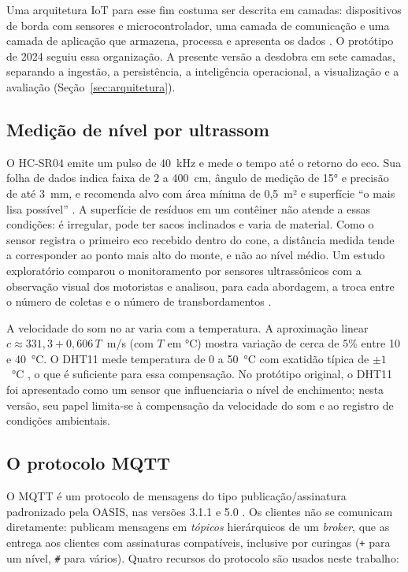 Uma arquitetura IoT para esse fim costuma ser descrita em camadas: dispositivos
de borda com sensores e microcontrolador, uma camada de comunicação e uma
camada de aplicação que armazena, processa e apresenta os dados
\cite{oliveira2018arquitetura}. O protótipo de 2024 seguiu essa organização.
A presente versão a desdobra em sete camadas, separando a ingestão, a
persistência, a inteligência operacional, a visualização e a avaliação
(Seção~\ref{sec:arquitetura}).

\subsection{Medição de nível por ultrassom}

O HC-SR04 emite um pulso de 40~kHz e mede o tempo até o retorno do eco. Sua
folha de dados indica faixa de 2 a 400~cm, ângulo de medição de 15° e precisão
de até 3~mm, e recomenda alvo com área mínima de 0,5~m² e superfície ``o mais
lisa possível'' \cite{elecfreakssdhcsr04}. A superfície de resíduos em um
contêiner não atende a essas condições: é irregular, pode ter sacos inclinados
e varia de material. Como o sensor registra o primeiro eco recebido dentro do
cone, a distância medida tende a corresponder ao ponto mais alto do monte, e
não ao nível médio. Um estudo exploratório comparou o monitoramento por sensores ultrassônicos com
a observação visual dos motoristas e analisou, para cada abordagem, a troca
entre o número de coletas e o número de transbordamentos
\cite{brouwer2023comparison}.

A velocidade do som no ar varia com a temperatura. A aproximação linear
$c \approx 331{,}3 + 0{,}606\,T$~m/s (com $T$ em °C) mostra variação de cerca
de 5\% entre 10 e 40~°C. O DHT11 mede temperatura de 0 a 50~°C com exatidão
típica de $\pm1$~°C \cite{drobotics2010dht11}, o que é suficiente para essa
compensação. No protótipo original, o DHT11 foi apresentado como um sensor que
influenciaria o nível de enchimento; nesta versão, seu papel limita-se à
compensação da velocidade do som e ao registro de condições ambientais.

\subsection{O protocolo MQTT}

O MQTT é um protocolo de mensagens do tipo publicação/assinatura padronizado
pela OASIS, nas versões 3.1.1 \cite{banks2014mqtt} e 5.0 \cite{banks2019mqtt}.
Os clientes não se comunicam diretamente: publicam mensagens em
\emph{tópicos} hierárquicos de um \emph{broker}, que as entrega aos clientes
com assinaturas compatíveis, inclusive por curingas (\texttt{+} para um nível,
\texttt{\#} para vários). Quatro recursos do protocolo são usados neste
trabalho:

